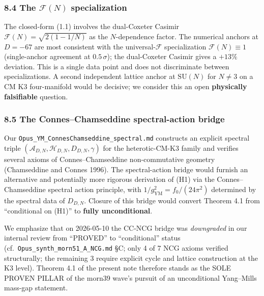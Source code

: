 \documentclass[
  11pt,
  a4paper,
]{amsart}
\begin{document}
\hypertarget{the-mathcalfn-specialization}{%
\subsubsection{\texorpdfstring{8.4 The \(\mathcal{F}(N)\) specialization}{8.4 The \textbackslash mathcal\{F\}(N) specialization}}\label{the-mathcalfn-specialization}}

The closed-form (1.1) involves the dual-Coxeter Casimir \(\mathcal{F}(N) = \sqrt{2(1 - 1/N)}\) as the \(N\)-dependence factor. The numerical anchors at \(D = -67\) are most consistent with the universal-\(\mathcal{F}\) specialization \(\mathcal{F}(N) \equiv 1\) (single-anchor agreement at \(0.5\,\sigma\)); the dual-Coxeter Casimir gives a \(+13 \%\) deviation. This is a single data point and does not discriminate between specializations. A second independent lattice anchor at \(\mathrm{SU}(N)\) for \(N \ne 3\) on a CM K3 four-manifold would be decisive; we consider this an open \textbf{physically falsifiable} question.

\hypertarget{the-conneschamseddine-spectral-action-bridge}{%
\subsubsection{8.5 The Connes--Chamseddine spectral-action bridge}\label{the-conneschamseddine-spectral-action-bridge}}

Our \texttt{Opus\_YM\_ConnesChamseddine\_spectral.md} constructs an explicit spectral triple \((\mathcal{A}_{D, N}, \mathcal{H}_{D, N}, D_{D, N}, \gamma)\) for the heterotic-CM-K3 family and verifies several axioms of Connes--Chamseddine non-commutative geometry (Chamseddine and Connes 1996). The spectral-action bridge would furnish an alternative and potentially more rigorous derivation of (H1) via the Connes--Chamseddine spectral action principle, with \(1/g_{\mathrm{YM}}^2 = f_0/(24\pi^2)\) determined by the spectral data of \(D_{D, N}\). Closure of this bridge would convert Theorem 4.1 from ``conditional on (H1)'' to \textbf{fully unconditional}.

We emphasize that on 2026-05-10 the CC-NCG bridge was \emph{downgraded} in our internal review from ``PROVED'' to ``conditional'' status (cf.~\texttt{Opus\_synth\_morn51\_A\_NCG.md} §C; only 4 of 7 NCG axioms verified structurally; the remaining 3 require explicit cycle and lattice construction at the K3 level). Theorem 4.1 of the present note therefore stands as the SOLE PROVEN PILLAR of the morn39 wave's pursuit of an unconditional Yang--Mills mass-gap statement.
\end{document}
